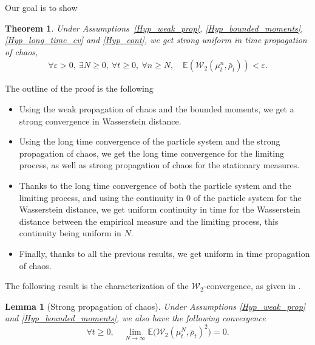 \documentclass[JEP,XML,SOM,Unicode,published]{cedram}
\let\epsilon\varepsilon
\theoremstyle{plain}
\newtheorem{theorem}{Theorem}
\newtheorem{lemma}{Lemma}[section]
\theoremstyle{definition}
\begin{document}
Our goal is to show
\begin{theorem}\label{unif_prop_chaos_a_partir_de_tout_un_tas_de_proprietes_que_je_ne_vais_pas_donner_parce_que_la_reference_devient_trop_longue_mais_vous_voyez_l_idee}
Under Assumptions~\ref{Hyp_weak_prop}, \ref{Hyp_bounded_moments}, \ref{Hyp_long_time_cv} and \ref{Hyp_cont}, we get strong uniform in time propagation of chaos, \ie
\begin{align*}
\forall \epsilon>0,\ \exists N\geq0,\ \forall t\geq0,\ \forall n\geq N,\quad \mathbb{E}\left(\mathcal{W}_2\left(\mu^n_t,\bar{\rho}_t\right)\right)<\epsilon.
\end{align*}
\end{theorem}

The outline of the proof is the following
\begin{itemize}
\item Using the weak propagation of chaos and the bounded moments, we get a strong convergence in Wasserstein distance.
\item Using the long time convergence of the particle system and the strong propagation of chaos, we get the long time convergence for the limiting process, as well as strong propagation of chaos for the stationary measures.
\item Thanks to the long time convergence of both the particle system and the limiting process, and using the continuity in $0$ of the particle system for the Wasserstein distance, we get uniform continuity in time for the Wasserstein distance between the empirical measure and the limiting process, this continuity being uniform in $N$.
\item Finally, thanks to all the previous results, we get uniform in time propagation of chaos.
\end{itemize}

The following result is the characterization of the $\mathcal{W}_2$-convergence, as given in \cite[Th.\,6.9]{villani2008optimal}.

\begin{lemma}[Strong propagation of chaos]\label{strong_prop}
Under Assumptions \ref{Hyp_weak_prop} and \ref{Hyp_bounded_moments}, we also have the following convergence
\begin{equation}
\forall t\geq0,\quad \lim_{N\to\infty}\mathbb{E}\bigl(\mathcal{W}_2\left(\mu^N_t,\bar{\rho}_t\right)^2\bigr)=0.
\end{equation}
\end{lemma}
\end{document}
